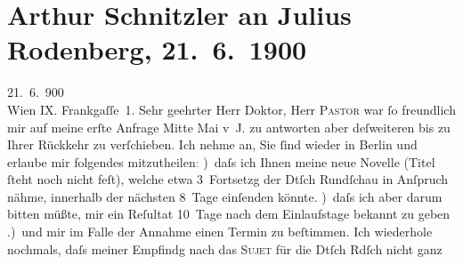 

               \section[Arthur Schnitzler an Julius Rodenberg, 21. 6. 1900]{ Arthur Schnitzler an Julius Rodenberg, 21. 6. 1900}\nopagebreak{}\rehead{ }\begin{ledgroupsized}[t]{13cm}\normalsize\beginnumbering{} \toendnotes[C]{\smallbreak\pagebreak[2]} 
\toendnotes[C]{\smallbreak}\pstart
           \raggedleft{}{\pb}21. 6. 900{\\}Wien IX. Frankgaſſe 1.\pend
           \pstart{}Sehr geehrter Herr Doktor,\pend\pstart
           Herr \textsc{Pastor} war ſo freundlich mir auf meine erſte Anfrage Mitte Mai v J.
                    zu antworten aber deſweiteren bis zu Ihrer Rückkehr zu verſchieben. Ich nehme
                    an, Sie ſind wieder in Berlin und erlaube mir
                    folgendes mitzutheilen\textcolor{gray}{:}\pend
           ) daſs ich Ihnen meine neue Novelle (Titel ſteht noch nicht {\pb}feſt), welche etwa 3 Fortsetzg der Dtſch
                        Rundſchau in Anſpruch nähme, innerhalb der nächsten 8 Tage einſenden
                    könnte.\pend
           ) daſs ich aber darum bitten müßte, mir ein Reſultat  10 Tage nach dem Einlaufstage bekannt zu
                    geben\pend
           .) und mir im Falle der Annahme einen Termin zu {\pb}beſtimmen.\pend
           \pstart
           Ich wiederhole nochmals, daſs meiner Empfindg nach das \textsc{Sujet} für die Dtſch Rdſch nicht ganz

\end{ledgroupsized}

